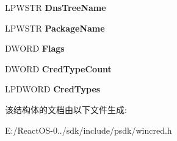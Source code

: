 \begin{DoxyCompactItemize}
L\+P\+W\+S\+TR {\bfseries Dns\+Tree\+Name}
\item 
\mbox{\label{struct___c_r_e_d_e_n_t_i_a_l___t_a_r_g_e_t___i_n_f_o_r_m_a_t_i_o_n_w_a1836c17269745d7d15cf1d6f432e89dd}} 
L\+P\+W\+S\+TR {\bfseries Package\+Name}
\item 
\mbox{\label{struct___c_r_e_d_e_n_t_i_a_l___t_a_r_g_e_t___i_n_f_o_r_m_a_t_i_o_n_w_ab204fbf2c89446fc87c2702f18463136}} 
D\+W\+O\+RD {\bfseries Flags}
\item 
\mbox{\label{struct___c_r_e_d_e_n_t_i_a_l___t_a_r_g_e_t___i_n_f_o_r_m_a_t_i_o_n_w_acd322552a7f79b70ac6afc607261ffbc}} 
D\+W\+O\+RD {\bfseries Cred\+Type\+Count}
\item 
\mbox{\label{struct___c_r_e_d_e_n_t_i_a_l___t_a_r_g_e_t___i_n_f_o_r_m_a_t_i_o_n_w_abc7cfe424d92f56f43a40b176b2b59c2}} 
L\+P\+D\+W\+O\+RD {\bfseries Cred\+Types}
\end{DoxyCompactItemize}


该结构体的文档由以下文件生成\+:\begin{DoxyCompactItemize}
\item 
E\+:/\+React\+O\+S-\/0../sdk/include/psdk/wincred.\+h\end{DoxyCompactItemize}
